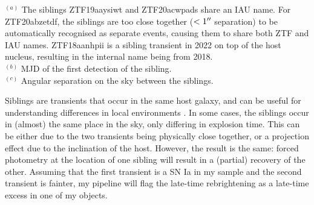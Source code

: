 \documentclass[a4paper,oneside,12pt, class=Latex/Classes/PhDthesisPSnPDF, crop=false]{standalone}
\begin{document}
\begin{table}
 \centering
 \caption{Objects with a detected sibling transient.}
 \begin{flushleft}
$^{(a)}$ The siblings ZTF19aaysiwt and ZTF20acwpads share an IAU name. For ZTF20abzetdf, the siblings are too close together ($<1^{\prime\prime}$ separation) to be automatically recognised as separate events, causing them to share both ZTF and IAU names. ZTF18aanhpii is a sibling transient in 2022 on top of the host nucleus, resulting in the internal name being from 2018. \\
$^{(b)}$ MJD of the first detection of the sibling. \\
$^{(c)}$ Angular separation on the sky between the siblings. \\
\end{flushleft} 
 \label{tab:siblings}
\end{table}

Siblings are transients that occur in the same host galaxy, and can be useful for understanding differences in local environments \citep[e.g.,][]{biswas_siblings, ZTF_siblings}. In some cases, the siblings occur in (almost) the same place in the sky, only differing in explosion time. This can be either due to the two transients being physically close together, or a projection effect due to the inclination of the host. However, the result is the same: forced photometry at the location of one sibling will result in a (partial) recovery of the other. Assuming that the first transient is a SN Ia in my sample and the second transient is fainter, my pipeline will flag the late-time rebrightening as a late-time excess in one of my objects.
\end{document}
